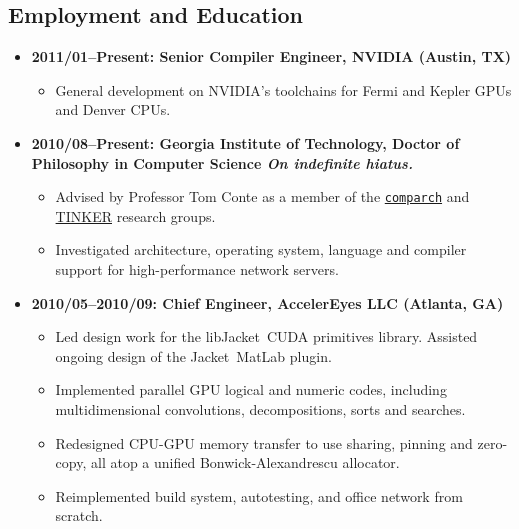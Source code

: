 \documentclass{article}
\newenvironment{tightitemize}
{\begin{itemize}
  \setlength{\itemsep}{1pt}
  \setlength{\parskip}{0pt}
  \setlength{\parsep}{0pt}}
{\end{itemize}}
\begin{document}
\subsection*{Employment and Education}
\begin{tightitemize}

\item \textbf{2011/01--Present: Senior Compiler Engineer, NVIDIA (Austin, TX)}
\begin{tightitemize}
\item General development on NVIDIA's toolchains for Fermi and Kepler GPUs and Denver CPUs.
\end{tightitemize}

\item \textbf{2010/08--Present: Georgia Institute of Technology,
Doctor of Philosophy in Computer Science
\hfill \tiny\textit{On indefinite hiatus.}}
\footnotesize
\begin{tightitemize}
\item Advised by Professor Tom Conte as a member of the \href{http://comparch.gatech.edu/}{\texttt{comparch}} and \href{http://tinker.cc.gatech.edu/}{TINKER} research groups.
\item Investigated architecture, operating system, language and compiler support for high-performance network servers.\\
\end{tightitemize}

\item \textbf{2010/05--2010/09: Chief Engineer, AccelerEyes LLC (Atlanta, GA)}
\begin{tightitemize}
\item Led design work for the libJacket\texttrademark\ CUDA primitives library. Assisted ongoing design of the Jacket\texttrademark\ MatLab\textsuperscript{\textregistered} plugin.
\item Implemented parallel GPU logical and numeric codes, including multidimensional convolutions, decompositions, sorts and searches.
\item Redesigned CPU-GPU memory transfer to use sharing, pinning and zero-copy, all atop a unified Bonwick-Alexandrescu allocator.
\item Reimplemented build system, autotesting, and office network from scratch.\\
\end{tightitemize}


\end{tightitemize}
\end{document}
